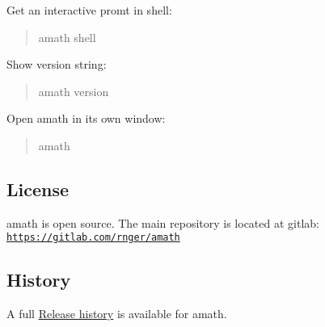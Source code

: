 Get an interactive promt in shell\+: \begin{quote}
amath shell \end{quote}


Show version string\+: \begin{quote}
amath version \end{quote}


Open amath in its own window\+: \begin{quote}
amath \end{quote}
\hypertarget{index_license}{}\subsection{License}\label{index_license}
amath is open source. The main repository is located at gitlab\+:~\newline
 \href{https://gitlab.com/rnger/amath}{\tt https\+://gitlab.\+com/rnger/amath}\hypertarget{index_history}{}\subsection{History}\label{index_history}
A full \hyperlink{release_page}{Release history} is available for amath. 